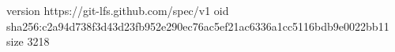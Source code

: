 version https://git-lfs.github.com/spec/v1
oid sha256:c2a94d738f3d43d23fb952e290ec76ac5ef21ac6336a1cc5116bdb9e0022bb11
size 3218
